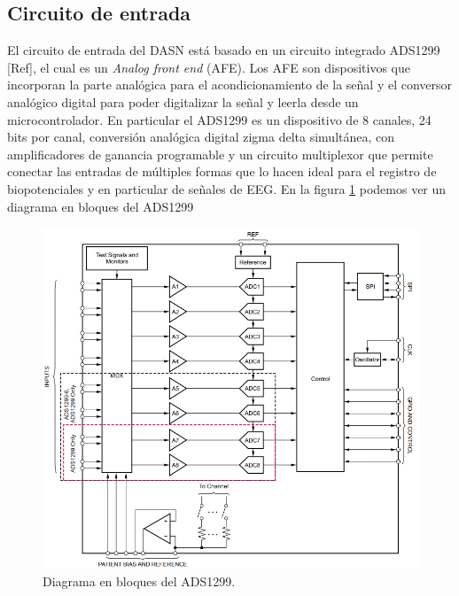 \subsection{Circuito de entrada}
El circuito de entrada del DASN está basado en un circuito integrado ADS1299 [Ref], el cual es un \textit{Analog front end} (AFE). Los AFE son dispositivos que incorporan la parte analógica para el acondicionamiento de la señal y el conversor analógico digital para poder digitalizar la señal y leerla desde un microcontrolador. En particular el ADS1299 es un dispositivo de 8 canales, 24 bits por canal, conversión analógica digital zigma delta simultánea, con amplificadores de ganancia programable y un circuito multiplexor que permite conectar las entradas de múltiples formas que lo hacen ideal para el registro de biopotenciales y en particular de señales de EEG. En la figura \ref{fig:diagBloquesADS1299} podemos ver un diagrama en bloques del ADS1299

\vspace{1cm}

\begin{figure}[htbp]
	\centering
	\includegraphics[width=1\textwidth]{./Figures/DiagramaEnBloquesADS1299.png}
	\caption{Diagrama en bloques del ADS1299.}
	\label{fig:diagBloquesADS1299}
\end{figure}

\vspace{1cm}

